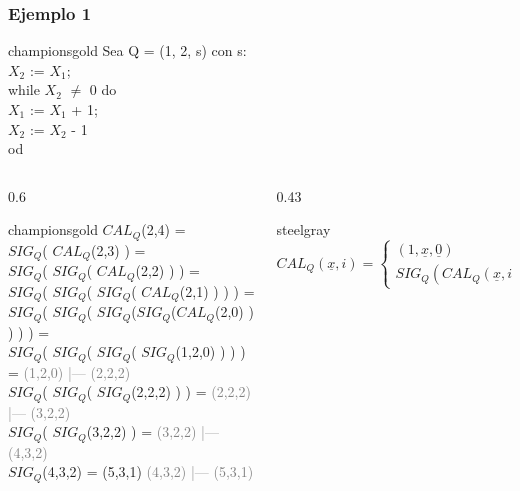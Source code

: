 \documentclass[xcolor=table]{beamer}
\begin{document}
\begin{frame}[fragile]\frametitle{Ejemplo 1} \footnotesize  


        \begin{colorblock}[black]{championsgold}{}\scriptsize
        Sea Q = (1, 2, s) con s: \\
        \hspace{0.5cm}   $X_2$ := $X_1$;\\
        \hspace{0.5cm}   while $X_2$ $\neq$ 0 do \\
        \hspace{0.75cm}    $X_1$ := $X_1$ + 1;\\
        \hspace{0.75cm}    $X_2$ := $X_2$ - 1\\
        \hspace{0.5cm}  od
        \end{colorblock}


\begin{columns}

    \begin{column}{0.6\textwidth}
        \begin{colorblock}[black]{championsgold}{}\scriptsize
        $CAL_Q$(2,4) = \\
        $SIG_Q$( $CAL_Q$(2,3) ) = \\
        $SIG_Q$( $SIG_Q$( $CAL_Q$(2,2) ) ) = \\
        $SIG_Q$( $SIG_Q$( $SIG_Q$( $CAL_Q$(2,1) ) ) ) = \\
        $SIG_Q$( $SIG_Q$( $SIG_Q$($SIG_Q$($CAL_Q$(2,0) ) ) ) ) = \\
        $SIG_Q$( $SIG_Q$( $SIG_Q$( $SIG_Q$(1,2,0) ) ) ) = \textcolor{gray}{(1,2,0) |— (2,2,2)} \\
        $SIG_Q$( $SIG_Q$( $SIG_Q$(2,2,2) ) ) = \textcolor{gray}{(2,2,2) |— (3,2,2)} \\ %
        $SIG_Q$( $SIG_Q$(3,2,2) ) =  \textcolor{gray}{(3,2,2) |— (4,3,2)} \\ 
        $SIG_Q$(4,3,2) =  (5,3,1) \textcolor{gray}{(4,3,2) |— (5,3,1)} \\ 
        \end{colorblock}
        \end{column}

    \begin{column}{0.43\textwidth}
        \begin{colorblock}[white]{steelgray}{}\scriptsize
           \scriptsize\begin{equation*} CAL_Q(\underline{x},i) = 
            \begin{cases} 
                    (1,\underline{x},\underline{0})      & si\; i=0 \\
                    SIG_Q (CAL_Q(\underline{x},i-1))      & si\; i>0 
            \end{cases} \end{equation*}   
            \end{colorblock}
    \end{column}



\end{columns}
\end{frame}
\end{document}
